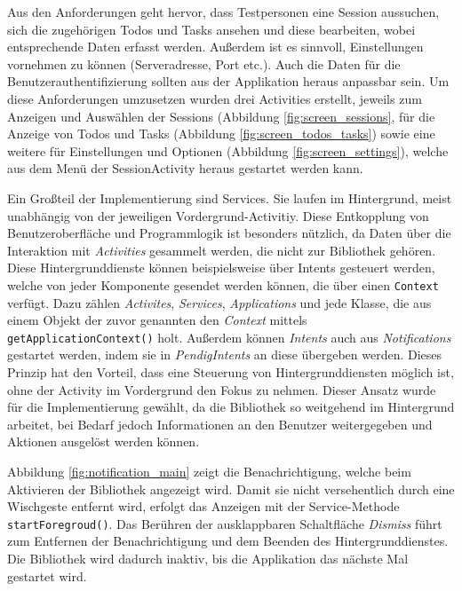Aus den Anforderungen geht hervor, dass Testpersonen eine Session aussuchen, sich die zugehörigen Todos und Tasks ansehen und diese bearbeiten, wobei entsprechende Daten erfasst werden.
Außerdem ist es sinnvoll, Einstellungen vornehmen zu können (Serveradresse, Port etc.). Auch die Daten für die Benutzerauthentifizierung sollten aus der Applikation heraus anpassbar sein.
Um diese Anforderungen umzusetzen wurden drei Activities erstellt, jeweils zum Anzeigen und Auswählen der Sessions (Abbildung \ref{fig:screen_sessions}, für die Anzeige von Todos und Tasks (Abbildung \ref{fig:screen_todos_tasks}) sowie eine weitere für Einstellungen und Optionen (Abbildung \ref{fig:screen_settings}), welche aus dem Menü der SessionActivity heraus gestartet werden kann.

Ein Großteil der Implementierung sind Services.
Sie laufen im Hintergrund, meist unabhängig von der jeweiligen Vordergrund-Activitiy.
Diese Entkopplung von Benutzeroberfläche und Programmlogik ist besonders nützlich, da Daten über die Interaktion mit \emph{Activities} gesammelt werden, die nicht zur Bibliothek gehören.
Diese Hintergrunddienste können beispielsweise über Intents gesteuert werden, welche von jeder Komponente gesendet werden können, die über einen \texttt{Context} verfügt.
Dazu zählen \emph{Activites}, \emph{Services}, \emph{Applications} und jede Klasse, die aus einem Objekt der zuvor genannten den \emph{Context} mittels \texttt{getApplicationContext()} holt.
Außerdem können \emph{Intents} auch aus \emph{Notifications} gestartet werden, indem sie in \emph{PendigIntents} an diese übergeben werden.
Dieses Prinzip hat den Vorteil, dass eine Steuerung von Hintergrunddiensten möglich ist, ohne der Activity im Vordergrund den Fokus zu nehmen.
Dieser Ansatz wurde für die Implementierung gewählt, da die Bibliothek so weitgehend im Hintergrund arbeitet, bei Bedarf jedoch Informationen an den Benutzer weitergegeben und Aktionen ausgelöst werden können.

Abbildung \ref{fig:notification_main} zeigt die Benachrichtigung, welche beim Aktivieren der Bibliothek angezeigt wird. 
Damit sie nicht versehentlich durch eine Wischgeste entfernt wird, erfolgt das Anzeigen mit der Service-Methode \texttt{startForegroud()}.
Das Berühren der ausklappbaren Schaltfläche \emph{Dismiss} führt zum Entfernen der Benachrichtigung und dem Beenden des Hintergrunddienstes.
Die Bibliothek wird dadurch inaktiv, bis die Applikation das nächste Mal gestartet wird.

